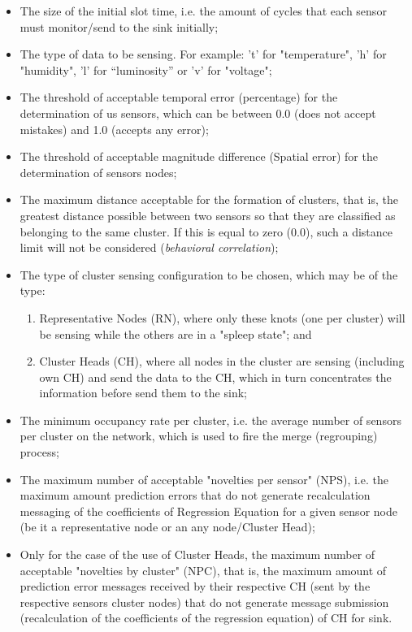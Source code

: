 \documentclass[conference]{IEEEtran}
\begin{document}
\begin{itemize}
  \item The size of the initial slot time, i.e. the amount of cycles that each
sensor must monitor/send to the sink initially;
  \item The type of data to be sensing. For example: 't' for "temperature",
'h' for "humidity", 'l' for ``luminosity'' or 'v' for "voltage";
  \item The threshold of acceptable temporal error (percentage) for the
determination of us sensors, which can be between 0.0 (does not accept mistakes)
and 1.0 (accepts any error);
  \item The threshold of acceptable magnitude difference (Spatial error) for the
determination of sensors nodes;
  \item The maximum distance acceptable for the formation of clusters, that is,
the greatest distance possible between two sensors so that they are classified
as belonging to the same cluster. If this is equal to zero (0.0), such a
distance limit will not be considered (\textit{behavioral correlation});
  \item The type of cluster sensing configuration to be chosen, which may be of
the type:
	\begin{enumerate}
	  	\item Representative Nodes (RN), where only these knots (one per cluster)
	  	will be sensing while the others are in a "spleep state"; and
		\item Cluster Heads (CH), where all nodes in the cluster are sensing
		(including own CH) and send the data to the CH, which in turn concentrates the
		information before send them to the sink;
	\end{enumerate}
  \item The minimum occupancy rate per cluster, i.e. the average number of
sensors per cluster on the network, which is used to fire the merge (regrouping)
process;
  \item The maximum number of acceptable "novelties per sensor" (NPS), i.e. the
maximum amount prediction errors that do not generate recalculation messaging
of the coefficients of Regression Equation for a given sensor node (be it a
representative node or an any node/Cluster Head);
  \item Only for the case of the use of Cluster Heads, the maximum number of
acceptable "novelties by cluster" (NPC), that is, the maximum amount of
prediction error messages received by their respective CH (sent by the
respective sensors cluster nodes) that do not generate message submission
(recalculation of the coefficients of the regression equation) of CH for sink.
\end{itemize}
\end{document}
